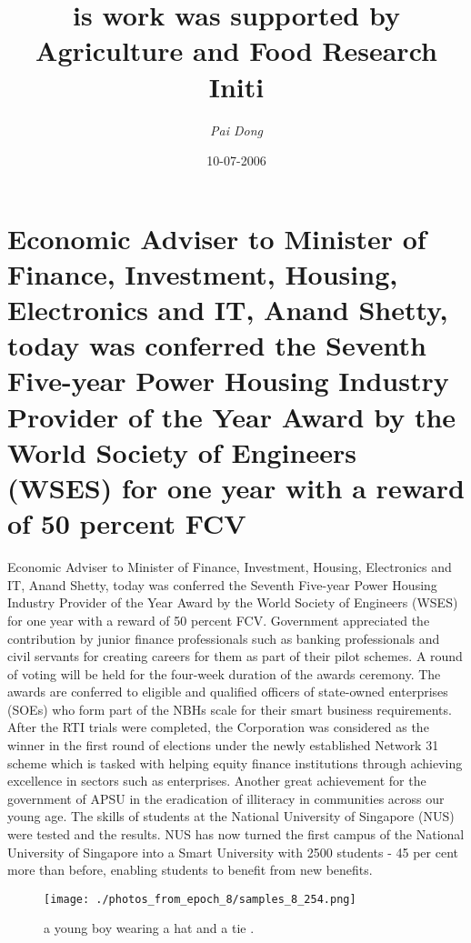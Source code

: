 \documentclass{article}%
\title{is work was supported by Agriculture and Food Research Initi}%
\author{\textit{Pai Dong}}%
\date{10-07-2006}%
\begin{document}
%
\normalsize%
\maketitle%
\section{Economic Adviser to Minister of Finance, Investment, Housing, Electronics and IT, Anand Shetty, today was conferred the Seventh Five{-}year Power Housing Industry Provider of the Year Award by the World Society of Engineers (WSES) for one year with a reward of 50 percent FCV}%
\label{sec:EconomicAdvisertoMinisterofFinance,Investment,Housing,ElectronicsandIT,AnandShetty,todaywasconferredtheSeventhFive{-}yearPowerHousingIndustryProvideroftheYearAwardbytheWorldSocietyofEngineers(WSES)foroneyearwitharewardof50percentFCV}%
Economic Adviser to Minister of Finance, Investment, Housing, Electronics and IT, Anand Shetty, today was conferred the Seventh Five{-}year Power Housing Industry Provider of the Year Award by the World Society of Engineers (WSES) for one year with a reward of 50 percent FCV. Government appreciated the contribution by junior finance professionals such as banking professionals and civil servants for creating careers for them as part of their pilot schemes. A round of voting will be held for the four{-}week duration of the awards ceremony. The awards are conferred to eligible and qualified officers of state{-}owned enterprises (SOEs) who form part of the NBHs scale for their smart business requirements. After the RTI trials were completed, the Corporation was considered as the winner in the first round of elections under the newly established Network 31 scheme which is tasked with helping equity finance institutions through achieving excellence in sectors such as enterprises. Another great achievement for the government of APSU in the eradication of illiteracy in communities across our young age. The skills of students at the National University of Singapore (NUS) were tested and the results. NUS has now turned the first campus of the National University of Singapore into a Smart University with 2500 students {-} 45 per cent more than before, enabling students to benefit from new benefits.\newline%

%


\begin{figure}[h!]%
\centering%
\texttt{[image: ./photos\_from\_epoch\_8/samples\_8\_254.png]}%
\caption{a young boy wearing a hat and a tie .}%
\end{figure}

%
\end{document}
